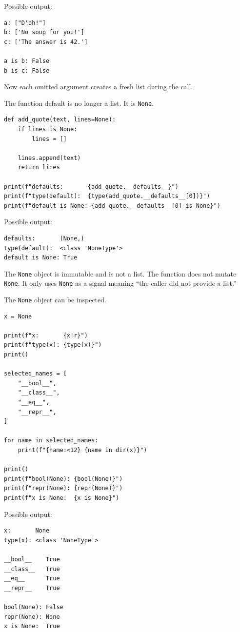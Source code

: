 Possible output:

\begin{verbatim}
a: ["D'oh!"]
b: ['No soup for you!']
c: ['The answer is 42.']

a is b: False
b is c: False
\end{verbatim}

Now each omitted argument creates a fresh list during the call.

The function default is no longer a list. It is \texttt{None}.

\begin{verbatim}
def add_quote(text, lines=None):
    if lines is None:
        lines = []

    lines.append(text)
    return lines

print(f"defaults:       {add_quote.__defaults__}")
print(f"type(default):  {type(add_quote.__defaults__[0])}")
print(f"default is None: {add_quote.__defaults__[0] is None}")
\end{verbatim}

Possible output:

\begin{verbatim}
defaults:       (None,)
type(default):  <class 'NoneType'>
default is None: True
\end{verbatim}

The \texttt{None} object is immutable and is not a list. The function does not mutate \texttt{None}. It only uses \texttt{None} as a signal meaning ``the caller did not provide a list.''

The \texttt{None} object can be inspected.

\begin{verbatim}
x = None

print(f"x:       {x!r}")
print(f"type(x): {type(x)}")
print()

selected_names = [
    "__bool__",
    "__class__",
    "__eq__",
    "__repr__",
]

for name in selected_names:
    print(f"{name:<12} {name in dir(x)}")

print()
print(f"bool(None): {bool(None)}")
print(f"repr(None): {repr(None)}")
print(f"x is None:  {x is None}")
\end{verbatim}

Possible output:

\begin{verbatim}
x:       None
type(x): <class 'NoneType'>

__bool__    True
__class__   True
__eq__      True
__repr__    True

bool(None): False
repr(None): None
x is None:  True
\end{verbatim}

